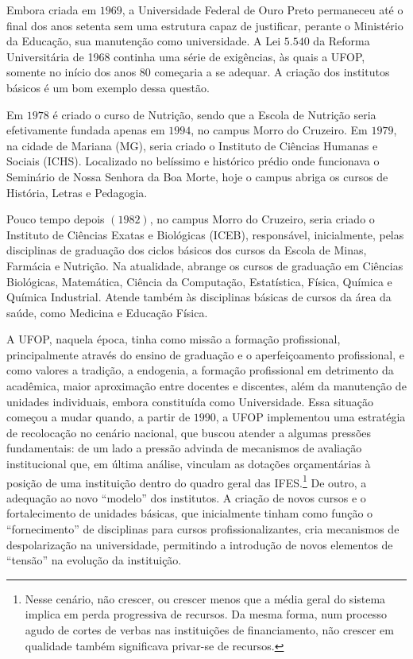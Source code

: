 Embora criada em $1969$, a Universidade Federal de Ouro Preto permaneceu até o final dos anos setenta sem uma estrutura capaz de justificar, perante o Ministério da Educação, sua manutenção como universidade. A Lei $5.540$ da Reforma Universitária de 1968 continha uma série de exigências, às quais a UFOP, somente no início dos anos $80$ começaria a se adequar. A criação dos institutos básicos é um bom exemplo dessa questão. 

Em $1978$ é criado o curso de Nutrição, sendo que a Escola de Nutrição seria efetivamente fundada apenas em $1994$, no campus Morro do Cruzeiro. Em $1979$, na cidade de Mariana (MG), seria criado o Instituto de Ciências Humanas e Sociais (ICHS). Localizado no belíssimo e histórico prédio onde funcionava o Seminário de Nossa Senhora da Boa Morte, hoje o campus abriga os cursos de História, Letras e Pedagogia.

Pouco tempo depois $(1982)$, no campus Morro do Cruzeiro, seria criado o Instituto de Ciências Exatas e Biológicas (ICEB), responsável, inicialmente, pelas disciplinas de graduação dos ciclos básicos dos cursos da Escola de Minas, Farmácia e Nutrição. Na atualidade, abrange os cursos de graduação em Ciências Biológicas, Matemática, Ciência da Computação, Estatística, Física, Química e Química Industrial. Atende também às disciplinas básicas de cursos da área da saúde, como Medicina e Educação Física.

A UFOP, naquela época, tinha como missão a formação profissional, principalmente através do ensino de graduação e o aperfeiçoamento profissional, e como valores a tradição, a endogenia, a formação profissional em detrimento da acadêmica, maior aproximação entre docentes e discentes, além da manutenção de unidades individuais, embora constituída como Universidade. Essa situação começou a mudar quando, a partir de $1990$, a UFOP implementou uma estratégia de recolocação no cenário nacional, que buscou atender a algumas pressões fundamentais: de um lado a pressão advinda de mecanismos de avaliação institucional que, em última análise, vinculam as dotações orçamentárias à posição de uma instituição dentro do quadro geral das IFES.\footnote{Nesse cenário, não crescer, ou crescer menos que a média geral do sistema implica em perda progressiva de recursos. Da mesma forma, num processo agudo de cortes de verbas nas instituições de financiamento, não crescer em qualidade também significava privar-se de recursos.} De outro, a adequação ao novo ``modelo'' dos institutos. A criação de novos cursos e o fortalecimento de unidades básicas, que inicialmente tinham como função o ``fornecimento'' de disciplinas para cursos profissionalizantes, cria mecanismos de despolarização na universidade, permitindo a introdução de novos elementos de ``tensão'' na evolução da instituição.


